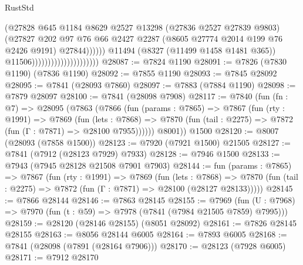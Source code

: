 \begin{lexlean}{RustStd}
\begin{coremodule}
                                                      (@27828
                                                        @645
                                                        @1184
                                                        @8629
                                                        @2527
                                                        @13298
                                                        (@27836 @2527 @27839 @9803)
                                                        (@27827
                                                          @202
                                                          @97
                                                          @76
                                                          @66
                                                          @2427
                                                          @2287
                                                          (@8605 @27774 @2014 @199 @76 @2426 @9191)
                                                          @27844))))))
                                              @11494
                                              (@8327 (@11499 @1458 @1481 @365))
                                              @11506)))))))))))))))))))))
@28087 := @7824 @1190
@28091 := @7826 (@7830 @1190) (@7836 @1190)
@28092 := @7855 @1190
@28093 := @7845 @28092
@28095 := @7841 (@28093 @7860)
@28097 := @7883 (@7884 @1190)
@28098 := @7879 @28097
@28100 := @7841 (@28098 @7908)
@28117 := @7840
    (fun (fn : @7) =>
    @28095
      (@7863
        (@7866
          (fun (params : @7865) =>
          @7867
            (fun (rty : @1991) =>
            @7869
              (fun (lets : @7868) =>
              @7870 (fun (tail : @2275) => @7872 (fun (Γ : @7871) => @28100 @7955))))))
        @8001))
    @1500
@28120 := @8007 (@28093 (@7858 @1500))
@28123 := @7920 (@7921 @1500) @21505
@28127 := @7841 (@7912 (@28123 @7929) @7933)
@28128 := @7946 @1500
@28133 := @7943 (@7945 @28128 @21508 @7901 @7903)
@28144 := fun (params : @7865) =>
  @7867
    (fun (rty : @1991) =>
    @7869
      (fun (lets : @7868) =>
      @7870 (fun (tail : @2275) => @7872 (fun (Γ : @7871) => @28100 (@28127 @28133)))))
@28145 := @7866 @28144
@28146 := @7863 @28145
@28155 := @7969
    (fun (U : @7968) => @7970 (fun (t : @59) => @7978 (@7841 (@7984 @21505 @7859) @7995)))
@28159 := @28120 (@28146 @28155) (@8051 @28092)
@28161 := @7826 @28145 @28155
@28163 := @8056 @28144 @6005
@28164 := @7893 @6005
@28168 := @7841 (@28098 (@7891 (@28164 @7906)))
@28170 := @28123 (@7928 @6005)
@28171 := @7912 @28170

\end{coremodule}
\end{lexlean}
